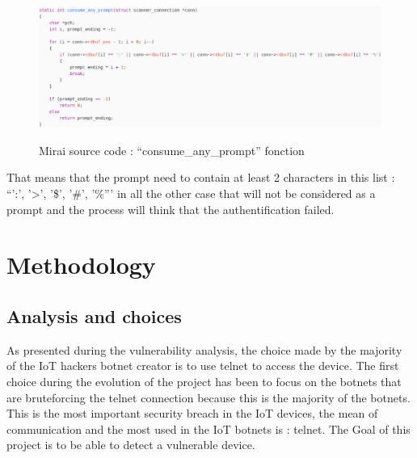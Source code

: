 \documentclass{report}
\begin{document}
\begin{figure}
  \caption{Mirai source code : ``consume\_any\_prompt'' fonction}
 \centering
 \includegraphics[width=1.2\textwidth]{./img/mirai-prompt}
 \label{fig:mirai-prompt}
\end{figure}
That means that the prompt need to contain at least 2 characters in this list : ``':', '>', '\$', '\#', '\%''' in all the other case that will not be considered as a prompt and the process will think that the authentification failed.

\chapter{Methodology}
\section{Analysis and choices}
As presented during the vulnerability analysis, the choice made by the majority of the IoT hackers botnet creator is to use telnet to access the device. \newline
The first choice during the evolution of the project has been to focus on the botnets that are bruteforcing the telnet connection because this is the majority of the botnets.
This is the most important security breach in the IoT devices, the mean of communication and the most used in the IoT botnets is : telnet. The Goal of this project is to be able to detect a vulnerable device.
\end{document}
